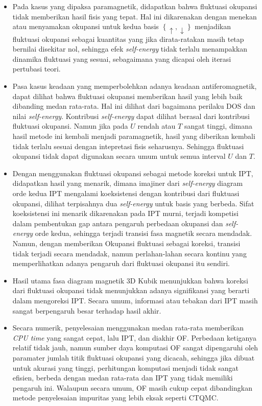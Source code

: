 \begin{itemize}
\item Pada kasus yang dipaksa paramagnetik, didapatkan bahwa fluktuasi okupansi tidak memberikan hasil fisis yang tepat. Hal ini dikarenakan dengan menekan atau menyamakan okupansi untuk kedua basis $\left\lbrace \uparrow, \downarrow\right\rbrace$ menjadikan fluktuasi okupansi sebagai kuantitas yang jika dirata-ratakan masih tetap bernilai disekitar nol, sehingga efek \textit{self-energy} tidak terlalu menampakkan dinamika fluktuasi yang sesuai, sebagaimana yang dicapai oleh iterasi pertubasi teori.

\item Pasa kasus keadaan yang memperbolehkan adanya keadaan antiferomagnetik, dapat dilihat bahwa fluktuasi okupansi memberikan hasil yang lebih baik dibanding medan rata-rata. Hal ini dilihat dari bagaimana perilaku DOS dan nilai \textit{self-energy}. Kontribusi \textit{self-energy} dapat dilihat berasal dari kontribusi fluktuasi okupansi. Namun jika pada $U$ rendah atau $T$ sangat tinggi, dimana hasil metode ini kembali menjadi paramagnetik, hasil yang diberikan kembali tidak terlalu sesuai dengan intepretasi fisis seharusnya. Sehingga fluktuasi okupansi tidak dapat digunakan secara umum untuk semua interval $U$ dan $T$.

\item Dengan menggunakan fluktuasi okupansi sebagai metode koreksi untuk IPT, didapatkan hasil yang menarik, dimana imajiner dari \textit{self-energy} diagram orde kedua IPT mengalami koeksistensi dengan kontribusi dari fluktuasi okupansi, dilihat terpisahnya dua \textit{self-energy} untuk basis yang berbeda. Sifat koeksistensi ini menarik dikarenakan pada IPT murni, terjadi kompetisi dalam pembentukan gap antara pengaruh perbedaan okupansi dan \textit{self-energy} orde kedua, sehingga terjadi transisi fasa magnetik secara mendadak. Namun, dengan memberikan Okupansi fluktuasi sebagai koreksi, transisi tidak terjadi secara mendadak, namun perlahan-lahan secara kontinu yang memperlihatkan adanya pengaruh dari fluktuasi okupansi itu sendiri.

\item Hasil utama fasa diagram magnetik 3D Kubik menunjukkan bahwa koreksi dari fluktuasi okupansi tidak menunjukkan adanya signifikansi yang berarti dalam mengoreksi IPT. Secara umum, informasi atau tebakan dari IPT masih sangat berpengaruh besar terhadap hasil akhir.

\item Secara numerik, penyelesaian menggunakan medan rata-rata memberikan \textit{CPU time} yang sangat cepat, lalu IPT, dan diakhir OF. Perbedaan ketiganya relatif tidak jauh, namun sumber daya komputasi OF sangat dipengaruhi oleh paramater jumlah titik fluktuasi okupansi yang dicacah, sehingga jika dibuat untuk akurasi yang tinggi, perhitungan komputasi menjadi tidak sangat efisien, berbeda dengan medan rata-rata dan IPT yang tidak memiliki pengaruh ini. Walaupun secara umum, OF masih cukup cepat dibandingkan metode penyelesaian impuritas yang lebih eksak seperti CTQMC.

\end{itemize}


